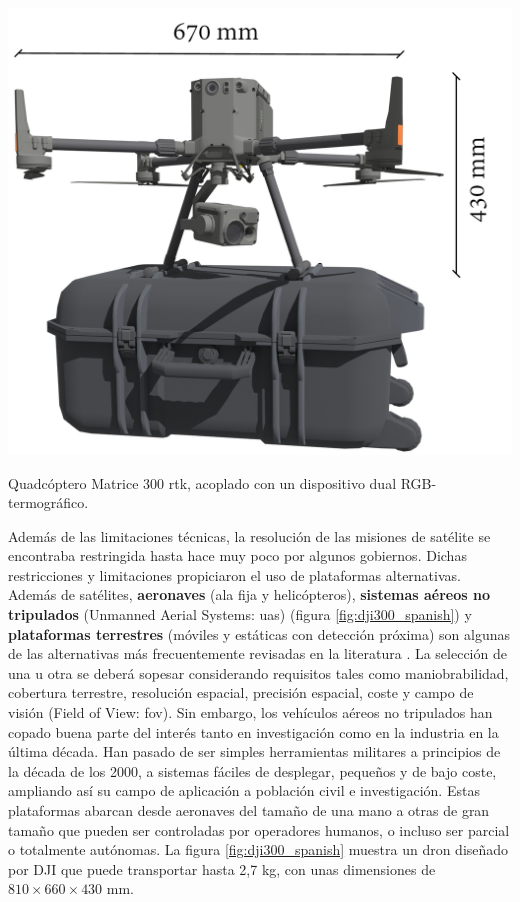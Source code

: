\begin{marginfigure}[.7cm]
	\includegraphics{figs/introduction/dji300.png}
	\caption{Quadcóptero Matrice 300 \acrshort{rtk}, acoplado con un dispositivo dual RGB-termográfico. }
	\label{fig:dji300_spanish}
\end{marginfigure}
Además de las limitaciones técnicas, la resolución de las misiones de satélite se encontraba restringida hasta hace muy poco por algunos gobiernos. Dichas restricciones y limitaciones propiciaron el uso de plataformas alternativas. Además de satélites, \textbf{aeronaves} (ala fija y helicópteros), \textbf{sistemas aéreos no tripulados} (Unmanned Aerial Systems: \acrshort{uas}) (figura \ref{fig:dji300_spanish}) y \textbf{plataformas terrestres} (móviles y estáticas con detección próxima) son algunas de las alternativas más frecuentemente revisadas en la literatura \cite{lillesand_remote_2015}. La selección de una u otra se deberá sopesar considerando requisitos tales como maniobrabilidad, cobertura terrestre, resolución espacial, precisión espacial, coste y campo de visión (Field of View: \acrshort{fov}). Sin embargo, los vehículos aéreos no tripulados han copado buena parte del interés tanto en investigación como en la industria en la última década. Han pasado de ser simples herramientas militares a principios de la década de los 2000, a sistemas fáciles de desplegar, pequeños y de bajo coste, ampliando así su campo de aplicación a población civil e investigación. Estas plataformas abarcan desde aeronaves del tamaño de una mano a otras de gran tamaño que pueden ser controladas por operadores humanos, o incluso ser parcial o totalmente autónomas. La figura \ref{fig:dji300_spanish} muestra un dron diseñado por DJI que puede transportar hasta 2,7 \si{\kilo\gram}, con unas dimensiones de $810 \times 660 \times 430$ \si{\milli\meter}.

